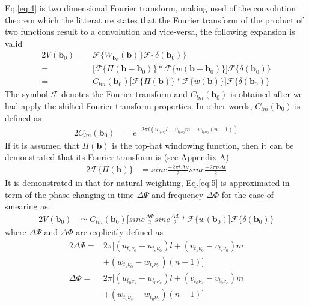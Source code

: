 Eq.\ref{eq:4} is two dimensional Fourier transform, making used of the convolution theorem which the litterature 
states that the Fourier transform of the product of two functions result to a convolution and vice-versa, the following
expansion is valid
\begin{alignat}{2}
V_{}(\mathbf{b}_0)  =& \mathcal{F}\Big\{W_{\mathbf{b}_0}(\mathbf{b})\Big\}\mathcal{F}\Big\{\delta(\mathbf{b}_0)\Big\} \\
		    =& \Bigg[\mathcal{F}\Big\{\Pi(\mathbf{b}-\mathbf{b}_0)\Big\}*\mathcal{F}\Big\{w(\mathbf{b}-\mathbf{b}_0)\Big\}\Bigg]\mathcal{F}\Big\{\delta(\mathbf{b}_0)\Big\}\\
		    =& C_{lm}(\mathbf{b}_0)\Bigg[\mathcal{F}\Big\{\Pi(\mathbf{b})\Big\}*\mathcal{F}\Big\{w(\mathbf{b})\Big\}\Bigg]\mathcal{F}\Big\{\delta(\mathbf{b}_0)\Big\}   \label{eq:5}
\end{alignat}
The symbol $\mathcal{F}$ denotes the Fourier transform and  $C_{lm}(\mathbf{b}_0)$ is obtained after we had apply the 
shifted Fourier transform properties. In other words, $C_{lm}(\mathbf{b}_0)$ is defined as
\begin{alignat*}{2}
C_{lm}(\mathbf{b}_0) &=e^{-2\pi i (u_{t_0\nu_0}l+v_{t_0\nu_0}m+w_{t_0\nu_0}(n-1))}
\end{alignat*}
If it is assumed that $\Pi(\mathbf{b})$ is the top-hat windowing function, then it can be demonstrated 
that its Fourier transform is (see Appendix A)
\begin{alignat*}{2}
\mathcal{F}\Big\{\Pi(\mathbf{b})\Big\}&=sinc\frac{-2\pi t\Delta \nu}{2}sinc\frac{-2\pi\nu\Delta t}{2}
\end{alignat*}
It is demonstrated in \citep{smirnov2011revisiting} that for  natural weighting, Eq.\ref{eq:5}  is approximated in term of the
phase changing in time $\Delta \Psi$ and frequency  $\Delta \Phi$ for the case of smearing as:
\begin{alignat*}{2}
V_{}(\mathbf{b}_0) &\simeq C_{lm}(\mathbf{b}_0)\Bigg[sinc\frac{\Delta \Psi}{2}sinc\frac{\Delta \Phi}{2}*\mathcal{F}\Big\{w(\mathbf{b}_0)\Bigg]\mathcal{F}\Big\{\delta(\mathbf{b}_0)\Big\}
\end{alignat*}
where $\Delta \Psi$ and $\Delta \Phi$ are explicitly defined as
\begin{alignat*}{2}
\Delta \Psi =&2\pi \Big[(u_{t_s\nu_0}-u_{t_e\nu_0})l + (v_{t_s\nu_0}-v_{t_e\nu_0})m\\
	    & +(w_{t_s\nu_0}-w_{t_e\nu_0})(n-1)\Big]\\
\Delta \Phi =&2\pi \Big[(u_{t_0\nu_s}-u_{t_0\nu_e})l + (v_{t_0\nu_s}-v_{t_0\nu_e})m\\
	    & +(w_{t_0\nu_s}-w_{t_0\nu_e})(n-1)\Big]
\end{alignat*}

